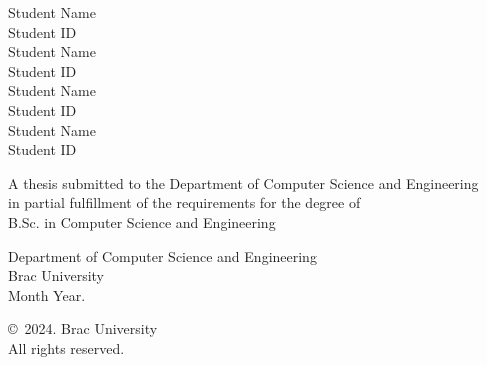 \begin{titlepage}
\renewcommand*{\thepage}{Title} %

    \begin{center} 
        \vspace*{3cm} %
        
        {\fontsize{16pt}{22pt}\selectfont{Final Year Thesis/Project Report Template}
        } %
        
        \vspace{1.5cm}
        
        
        \vspace{0.5cm}
        
        	Student Name\\
	        Student ID\\
	        Student Name\\
	        Student ID\\
	        Student Name\\
	        Student ID\\
	        Student Name\\
	        Student ID

        \vspace{1.5cm}
        
        	A thesis submitted to the Department of Computer Science and Engineering\\
            in partial fulfillment of the requirements for the degree of\\
            B.Sc. in Computer Science and Engineering

        
        \vspace{2.5cm}
        
    		Department of Computer Science and Engineering\\
            Brac University\\
            Month Year.
        
        \vspace{3cm}
        
    		\copyright\ 2024. Brac University\\
            All rights reserved.
    
    \end{center}

\end{titlepage}
